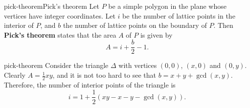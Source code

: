 \begin{topic}{pick-theorem}{Pick's theorem}
    Let $P$ be a simple polygon in the plane whose vertices have integer coordinates. Let $i$ be the number of lattice points in the interior of $P$, and $b$ the number of lattice points on the boundary of $P$. Then \textbf{Pick's theorem} states that the area $A$ of $P$ is given by
    \[ A = i + \frac{b}{2} - 1 . \]
\end{topic}

\begin{example}{pick-theorem}
    Consider the triangle $\Delta$ with vertices $(0, 0)$, $(x, 0)$ and $(0, y)$. Clearly $A = \frac{1}{2} x y$, and it is not too hard to see that $b = x + y + \gcd(x, y)$. Therefore, the number of interior points of the triangle is
    \[ i = 1 + \frac{1}{2}(xy - x - y - \gcd(x, y)) . \]
\end{example}
